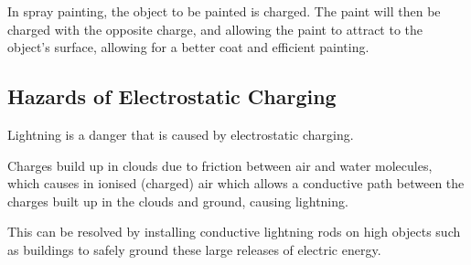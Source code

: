 \documentclass[../main.tex]{subfiles}
\begin{document}
		In spray painting, the object to be painted is charged. The paint will then be charged with the opposite charge, and allowing the paint to attract to the object's surface, allowing for a better coat and efficient painting.
		
		\subsection{Hazards of Electrostatic Charging}
		Lightning is a danger that is caused by electrostatic charging.
		
		Charges build up in clouds due to friction between air and water molecules, which causes in ionised (charged) air which allows a conductive path between the charges built up in the clouds and ground, causing lightning.
		
		This can be resolved by installing conductive lightning rods on high objects such as buildings to safely ground these large releases of electric energy.
\end{document}
